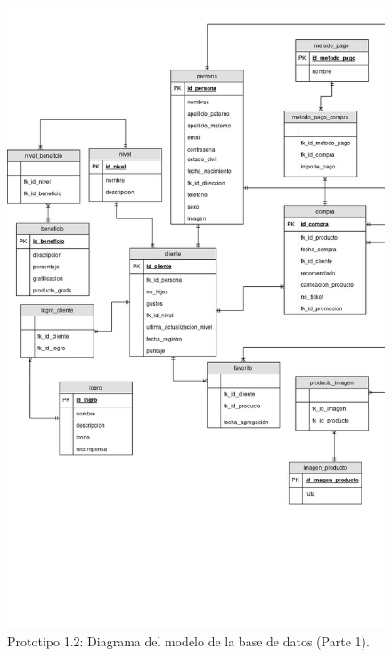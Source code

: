 \FloatBarrier
\begin{figure}[htbp!]
		\centering
			\includegraphics[width=.77 \textwidth]{imagenes/modeloDatos/prototipo12/TT_Database_11_1}
		\caption{Prototipo 1.2: Diagrama del modelo de la base de datos (Parte 1).}
		\label{image:prototipo12basededatos2}
\end{figure}
\FloatBarrier

